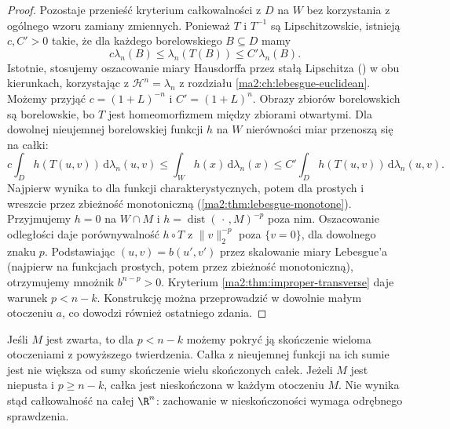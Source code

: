 \begin{proof}
Pozostaje przenieść kryterium całkowalności
z $D$ na $W$ bez korzystania z ogólnego
wzoru zamiany zmiennych.
Ponieważ $T$ i $T^{-1}$ są Lipschitzowskie,
istnieją $c,C'>0$ takie, że dla każdego
borelowskiego $B\subseteq D$ mamy
\[
 c\lambda_n(B)\le\lambda_n(T(B))
 \le C'\lambda_n(B).
\]
Istotnie, stosujemy oszacowanie miary
Hausdorffa przez stałą Lipschitza
()
w obu kierunkach, korzystając z
$\mathcal H^n=\lambda_n$ z rozdziału
\ref{ma2:ch:lebesgue-euclidean}.
Możemy przyjąć $c=(1+L)^{-n}$ i $C'=(1+L)^n$.
Obrazy zbiorów borelowskich są borelowskie,
bo $T$ jest homeomorfizmem między
zbiorami otwartymi. Dla dowolnej
nieujemnej borelowskiej funkcji $h$ na $W$
nierówności miar przenoszą się na całki:
\[
 c\int_D h(T(u,v))\,\mathrm d\lambda_n(u,v)
 \le\int_W h(x)\,\mathrm d\lambda_n(x)
 \le C'\int_D h(T(u,v))\,\mathrm d\lambda_n(u,v).
\]
Najpierw wynika to dla funkcji
charakterystycznych, potem dla prostych
i wreszcie przez zbieżność monotoniczną
(\ref{ma2:thm:lebesgue-monotone}).
Przyjmujemy $h=0$ na $W\cap M$ i
$h=\operatorname{dist}(\,\cdot\,,M)^{-p}$
poza nim. Oszacowanie odległości daje
porównywalność $h\circ T$ z $\|v\|_2^{-p}$
poza $\{v=0\}$, dla dowolnego znaku $p$.
Podstawiając $(u,v)=b(u',v')$ przez
skalowanie miary Lebesgue'a (najpierw
na funkcjach prostych, potem przez
zbieżność monotoniczną), otrzymujemy
mnożnik $b^{n-p}>0$. Kryterium
\ref{ma2:thm:improper-transverse}
daje warunek $p<n-k$.
Konstrukcję można przeprowadzić
w dowolnie małym otoczeniu $a$,
co dowodzi również ostatniego zdania.
\end{proof}

Jeśli $M$ jest zwarta, to dla $p<n-k$
możemy pokryć ją skończenie wieloma
otoczeniami z powyższego twierdzenia.
Całka z nieujemnej funkcji na ich sumie
jest nie większa od sumy skończenie wielu
skończonych całek. Jeżeli $M$ jest
niepusta i $p\ge n-k$, całka jest
nieskończona w każdym otoczeniu $M$.
Nie wynika stąd całkowalność na całej
$\R^n$: zachowanie w nieskończoności
wymaga odrębnego sprawdzenia.


